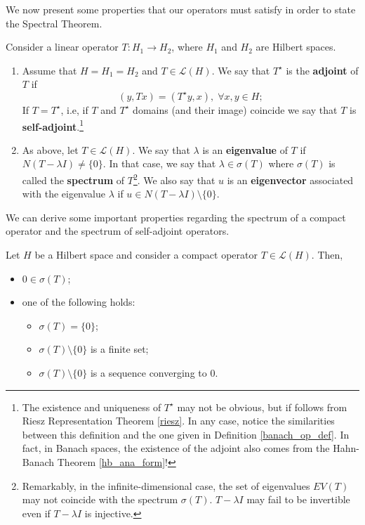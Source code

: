 We now present some properties that our operators must satisfy in order to state the Spectral Theorem.
\begin{definition}
    Consider a linear operator \(T: H_1 \rightarrow H_2\), where \(H_1\) and \(H_2\) are Hilbert spaces.
    \begin{enumerate}
        \item Assume that \(H = H_1=H_2\) and \(T \in \mathcal{L}(H)\). We say that \(T^\star\) is the \textbf{adjoint} of \(T\) if
        \[
        (y, T x) = (T^\star y, x), \; \forall x, y \in H;
        \]
        If \(T=T^\star\), i.e, if \(T\) and \(T^\star\) domains (and their image) coincide we say that \(T\) is \textbf{self-adjoint}.\footnote{The existence and uniqueness of \(T^\star\) may not be obvious, but if follows from Riesz Representation Theorem \ref{riesz}. In any case, notice the similarities between this definition and the one given in Definition \eqref{banach_op_def}. In fact, in Banach spaces, the existence of the adjoint also comes from the Hahn-Banach Theorem \ref{hb_ana_form}!}
        \item As above, let \(T \in \mathcal{L}(H)\). We say that \(\lambda\) is an \textbf{eigenvalue} of \(T\) if \(N(T - \lambda I) \neq \{0\}\). In that case, we say that \(\lambda \in \sigma(T)\) where \(\sigma(T)\) is called the \textbf{spectrum} of \(T\)\footnote{Remarkably, in the infinite-dimensional case, the set of eigenvalues \(EV(T)\) may not coincide with the spectrum \(\sigma(T)\). \(T - \lambda I\) may fail to be invertible even if \(T - \lambda I\) is injective.}. We also say that \(u\) is an \textbf{eigenvector} associated with the eigenvalue \(\lambda\) if \(u \in N(T-\lambda I)\setminus \{0\}\).
    \end{enumerate}
\end{definition}
We can derive some important properties regarding the spectrum of a compact operator and the spectrum of self-adjoint operators.
\begin{proposition}
    Let \(H\) be a Hilbert space and consider a compact operator \(T \in \mathcal{L}(H)\). Then,
    \begin{itemize}
        \item \(0 \in \sigma(T)\);
        \item one of the following holds:
        \begin{itemize}
            \item \(\sigma(T) = \{0\}\);
            \item \(\sigma(T)\setminus\{0\}\) is a finite set;
            \item \(\sigma(T)\setminus\{0\}\) is a sequence converging to \(0\).
        \end{itemize} 
    \end{itemize}
\end{proposition}
